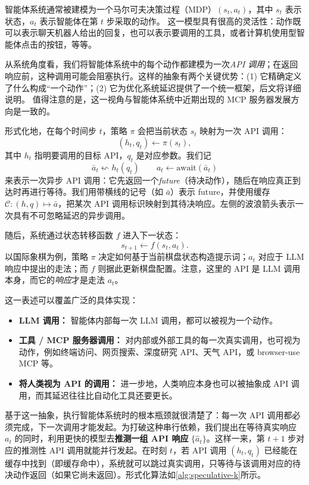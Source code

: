 智能体系统通常被建模为一个马尔可夫决策过程（MDP）$(s_t, a_t)$，其中 $s_t$ 表示状态，$a_t$ 表示智能体在第 $t$ 步采取的动作。
这一模型具有很高的灵活性：动作既可以表示聊天机器人给出的回复，也可以表示要调用的工具，或者计算机使用型智能体点击的按钮，等等。

从系统角度看，我们将智能体系统中的每个动作都建模为一次\emph{API 调用}；在返回响应前，这种调用可能会阻塞执行。这样的抽象有两个关键优势：(1) 它精确定义了什么构成“一个动作”；(2) 它为优化系统延迟提供了一个统一框架，后文将详细说明。
值得注意的是，这一视角与智能体系统中近期出现的 MCP 服务器发展方向是一致的\citep{anthropic2024model}。

形式化地，在每个时间步 $t$，策略 $\pi$ 会把当前状态 $s_t$ 映射为一次 API 调用：
\[
(h_t, q_t) \gets \pi(s_t),
\]
其中 $h_t$ 指明要调用的目标 API，$q_t$ 是对应参数。我们记
\[
\bar a_t \leftsquigarrow h_t(q_t)\qquad a_t \gets \mathrm{await}(\bar a_t)
\]
来表示一次异步 API 调用：它先返回一个\emph{future}（待决动作），随后在响应真正到达时再进行等待。我们用带横线的记号（如 $\bar a$）表示 future，并使用缓存 $\mathcal C:(h,q)\mapsto \bar a$，把某次 API 调用标识映射到其待决响应。左侧的波浪箭头表示一次具有不可忽略延迟的异步调用。

随后，系统通过状态转移函数 $f$ 进入下一状态：
\[
s_{t+1} \gets f(s_t, a_t).
\]
以国际象棋为例，策略 $\pi$ 决定如何基于当前棋盘状态构造提示词；$a_t$ 对应于 LLM 响应中提出的走法；而 $f$ 则据此更新棋盘配置。注意，这里的 API 是 LLM 调用本身，而它的\textit{响应}才是走法 $a_t$。

这一表述可以覆盖广泛的具体实现：
\begin{itemize}[leftmargin=*]
    \item \textbf{LLM 调用：} 智能体内部每一次 LLM 调用，都可以被视为一个动作。
    \item \textbf{工具 / MCP 服务器调用：} 对内部或外部工具的每一次真实调用，也可视为动作，例如终端访问、网页搜索、深度研究 API、天气 API，或 browser-use MCP 等。
    \item \textbf{将人类视为 API 的调用：} 进一步地，人类响应本身也可以被抽象成 API 调用，而其延迟往往比自动化工具还要更长。
\end{itemize}

基于这一抽象，执行智能体系统时的根本瓶颈就很清楚了：每一次 API 调用都必须完成，下一次调用才能发起。为打破这种串行依赖，我们提出在等待真实响应 $a_t$ 的同时，利用更快的模型去\textbf{推测一组 API 响应} $\{\hat a_t\}$。这样一来，第 $t+1$ 步对应的推测性 API 调用就能并行发起。在时刻 $t$，若 API 调用 $(h_t, q_t)$ 已经能在缓存中找到（即缓存命中），系统就可以跳过真实调用，只等待与该调用对应的待决动作返回（如果它尚未返回）。形式化算法如\cref{alg:speculative-k}所示。

